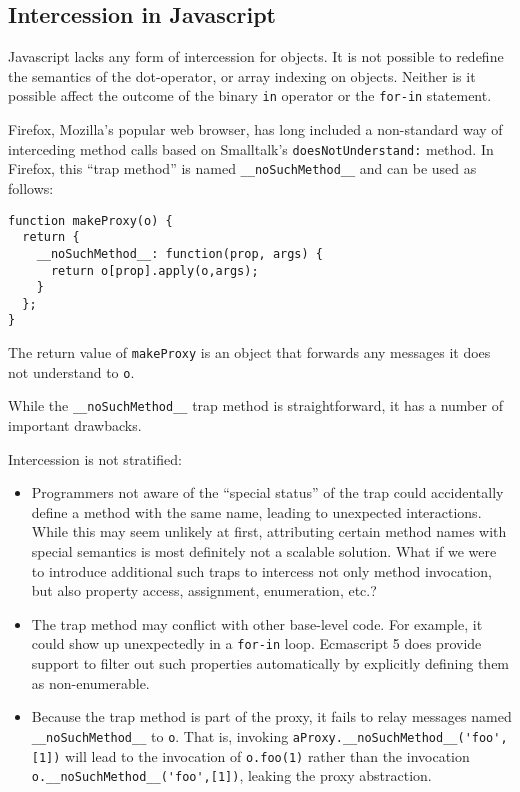 \documentclass[10pt,legalpaper]{article}
\begin{document}
\subsection{Intercession in Javascript}
\label{sub:intercession_in_javascript}

Javascript lacks any form of intercession for objects. It is not possible to redefine the semantics of the dot-operator, or array indexing on objects. Neither is it possible affect the outcome of the binary \texttt{in} operator or the \texttt{for-in} statement.

Firefox, Mozilla's popular web browser, has long included a non-standard way of interceding method calls based on Smalltalk's \texttt{doesNotUnderstand:} method. In Firefox, this ``trap method'' is named \lstinline{__noSuchMethod__} and can be used as follows:

\begin{lstlisting}
function makeProxy(o) {
  return {
    __noSuchMethod__: function(prop, args) {
      return o[prop].apply(o,args);
    }
  };
}
\end{lstlisting}

The return value of \texttt{makeProxy} is an object that forwards any messages it does not understand to \texttt{o}.

While the \lstinline{__noSuchMethod__} trap method is straightforward, it has a number of important drawbacks.

Intercession is not stratified:
\begin{itemize}
  \item Programmers not aware of the ``special status'' of the trap could accidentally define a method with the same name, leading to unexpected interactions. While this may seem unlikely at first, attributing certain method names with special semantics is most definitely not a scalable solution. What if we were to introduce additional such traps to intercess not only method invocation, but also property access, assignment, enumeration, etc.?
  
  \item The trap method may conflict with other base-level code. For example, it could show up unexpectedly in a \texttt{for-in} loop. Ecmascript 5 does provide support to filter out such properties automatically by explicitly defining them as non-enumerable.
  
  \item Because the trap method is part of the proxy, it fails to relay messages named \lstinline{__noSuchMethod__} to \texttt{o}. That is, invoking \lstinline{aProxy.__noSuchMethod__('foo',[1])} will lead to the invocation of \lstinline{o.foo(1)} rather than the invocation \lstinline{o.__noSuchMethod__('foo',[1])}, leaking the proxy abstraction.
  
\end{itemize}
\end{document}
